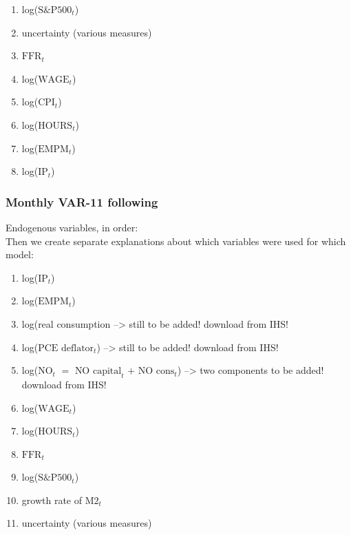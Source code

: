 \documentclass[a4paper,11pt,listof=nochaptergap,oneside,pointednumbers,bibtotoc,bigheadings,liststotoc]{scrbook}
\theoremstyle{mysatz}
\theoremstyle{mydefinition}
\theoremstyle{mybemerkung}
\renewcommand*{\paragraph}[1]{\subsubsection*{#1} \vspace{-3mm}} %
\begin{document}
\begingroup
\begin{spacing}{0.5}
    \fontsize{10pt}{12pt}\selectfont
\begin{enumerate}
	\item log($\text{S\&P500}_t$)
	\item uncertainty (various measures)
	\item $\text{FFR}_t$
	\item log($\text{WAGE}_t$)
	\item log($\text{CPI}_t$)
	\item log($\text{HOURS}_t$)
	\item log($\text{EMPM}_t$)	
	\item log($\text{IP}_t$)		
\end{enumerate}
\end{spacing}
\endgroup



\paragraph{Monthly VAR-11 following \citet{juradoetal:15}} Endogenous variables, in order:\\
Then we create separate explanations about which variables were used for which model:\\

\begingroup
\begin{spacing}{0.5}
    \fontsize{10pt}{12pt}\selectfont
\begin{enumerate}
	\item log($\text{IP}_t$)
	\item log($\text{EMPM}_t$)
	\item log(real consumption --> still to be added! download from IHS!
	\item log($\text{PCE deflator}_t$) --> still to be added! download from IHS!
	\item log($\text{NO}_t$ $=$ $\text{NO capital}_t$ $+$ $\text{NO cons}_t$) --> two components to be added! download from IHS!
	\item log($\text{WAGE}_t$)
	\item log($\text{HOURS}_t$)
	\item $\text{FFR}_t$
	\item log($\text{S\&P500}_t$)
	\item growth rate of $\text{M2}_t$
	\item uncertainty (various measures)
\end{enumerate}
\end{spacing}
\endgroup
\end{document}
